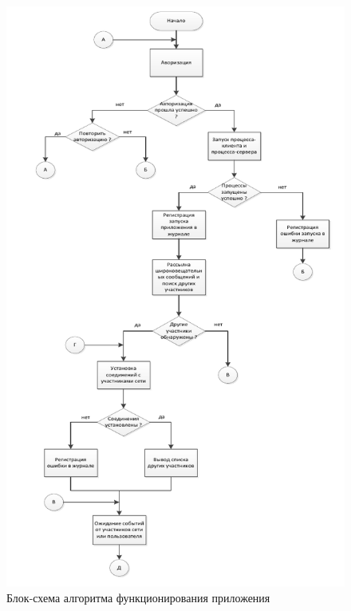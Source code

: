 \begin{figure}[!p]
    \centering
    \includegraphics[scale=0.8]{pic_6}
    \caption{Блок-схема алгоритма функционирования приложения}\label{pic_6}
\end{figure}

